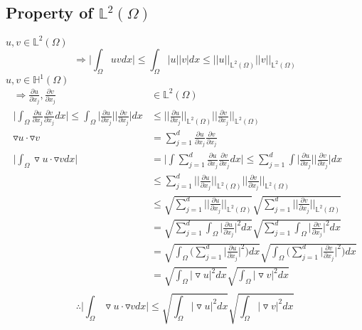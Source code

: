 \documentclass[a4paper,12pt]{article}
\newcommand{\Hspace}{\mathbb{H}}
\newcommand{\Lspace}{\mathbb{L}}
\begin{document}
\subsection{Property of $\Lspace^2(\Omega)$}
$u,v \in \Lspace^2(\Omega)$
\begin{equation}\nonumber
\Rightarrow \bigg|\int_{\Omega}uvdx\bigg| \leq \int_{\Omega}|u||v|dx \leq ||u||_{\Lspace^2(\Omega)} ||v||_{\Lspace^2(\Omega)}
\end{equation}
$u,v \in \Hspace^1(\Omega)$
\begin{equation}\nonumber
\begin{aligned}
\Rightarrow \frac{\partial u}{\partial x_j}, \frac{\partial v}{\partial x_j} & \in {\Lspace^2(\Omega)}\\
\bigg| \int_\Omega \frac{\partial u}{\partial x_j} \frac{\partial v}{\partial x_j}dx\bigg| \leq \int_\Omega \bigg| \frac{\partial u}{\partial x_j} \bigg| \bigg| \frac{\partial v}{\partial x_j} \bigg| dx & \leq \bigg|\bigg| \frac{\partial u}{\partial x_j}\bigg|\bigg|_{\Lspace^2(\Omega)} \bigg|\bigg| \frac{\partial v}{\partial x_j} \bigg|\bigg|_{\Lspace^2(\Omega)}\\
\triangledown u \cdot \triangledown v &= \sum_{j=1}^{d}\frac{\partial u}{\partial x_j} \frac{\partial v}{\partial x_j}\\
\bigg| \int_{\Omega} \triangledown u \cdot \triangledown v dx \bigg| &= \bigg| \int \sum_{j=1}^{d}\frac{\partial u}{\partial x_j} \frac{\partial v}{\partial x_j} dx \bigg| \leq  \sum_{j=1}^{d} \int \bigg| \frac{\partial u}{\partial x_j} \bigg| \bigg|  \frac{\partial v}{\partial x_j} \bigg| dx\\
&\leq \sum_{j=1}^{d} \bigg|\bigg| \frac{\partial u}{\partial x_j} \bigg|\bigg|_{\Lspace^2(\Omega)} \bigg|\bigg| \frac{\partial v}{\partial x_j} \bigg|\bigg|_{\Lspace^2(\Omega)}\\
&\leq \sqrt{\sum_{j=1}^{d} \bigg|\bigg| \frac{\partial u}{\partial x_j} \bigg|\bigg|_{\Lspace^2(\Omega)}} \sqrt{\sum_{j=1}^{d} \bigg|\bigg| \frac{\partial v}{\partial x_j} \bigg|\bigg|_{\Lspace^2(\Omega)}}\\
&= \sqrt{\sum_{j=1}^{d}\int_\Omega\bigg|\frac{\partial u}{\partial x_j}\bigg|^2 dx} \sqrt{\sum_{j=1}^{d}\int_\Omega\bigg|\frac{\partial v}{\partial x_j}\bigg|^2 dx}\\
&= \sqrt{\int_\Omega\bigg(\sum_{j=1}^{d}\bigg|\frac{\partial u}{\partial x_j}\bigg|^2\bigg) dx} \sqrt{\int_\Omega\bigg(\sum_{j=1}^{d}\bigg|\frac{\partial v}{\partial x_j}\bigg|^2\bigg) dx}\\
&= \sqrt{\int_\Omega\big| \triangledown u \big|^2 dx} \sqrt{\int_\Omega\big| \triangledown v \big|^2 dx}\\
\end{aligned}
\end{equation}
\begin{equation}
\therefore \bigg| \int_{\Omega} \triangledown u \cdot \triangledown v dx \bigg| \leq \sqrt{\int_\Omega\big| \triangledown u \big|^2 dx} \sqrt{\int_\Omega\big| \triangledown v \big|^2 dx}
\end{equation}
\end{document}
